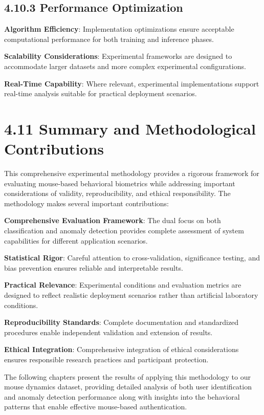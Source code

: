 \documentclass[
  12pt,
  a4paper,
]{report}
\begin{document}
\subsection{4.10.3 Performance
Optimization}\label{performance-optimization}

\textbf{Algorithm Efficiency}: Implementation optimizations ensure
acceptable computational performance for both training and inference
phases.

\textbf{Scalability Considerations}: Experimental frameworks are
designed to accommodate larger datasets and more complex experimental
configurations.

\textbf{Real-Time Capability}: Where relevant, experimental
implementations support real-time analysis suitable for practical
deployment scenarios.

\section{4.11 Summary and Methodological
Contributions}\label{summary-and-methodological-contributions}

This comprehensive experimental methodology provides a rigorous
framework for evaluating mouse-based behavioral biometrics while
addressing important considerations of validity, reproducibility, and
ethical responsibility. The methodology makes several important
contributions:

\textbf{Comprehensive Evaluation Framework}: The dual focus on both
classification and anomaly detection provides complete assessment of
system capabilities for different application scenarios.

\textbf{Statistical Rigor}: Careful attention to cross-validation,
significance testing, and bias prevention ensures reliable and
interpretable results.

\textbf{Practical Relevance}: Experimental conditions and evaluation
metrics are designed to reflect realistic deployment scenarios rather
than artificial laboratory conditions.

\textbf{Reproducibility Standards}: Complete documentation and
standardized procedures enable independent validation and extension of
results.

\textbf{Ethical Integration}: Comprehensive integration of ethical
considerations ensures responsible research practices and participant
protection.

The following chapters present the results of applying this methodology
to our mouse dynamics dataset, providing detailed analysis of both user
identification and anomaly detection performance along with insights
into the behavioral patterns that enable effective mouse-based
authentication.
\end{document}
